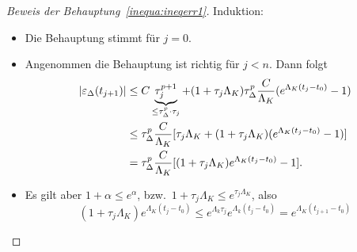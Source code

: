 \begin{proof}[Beweis der Behauptung~\eqref{inequa:ineqerr1}] Induktion:
	\begin{itemize}
		\item Die Behauptung stimmt für $j=0$.
		\item Angenommen die Behauptung ist richtig für $j<n$. Dann folgt
		\begin{align*}
			\lvert  \varepsilon_{\Delta} (t_{j+1})  \rvert
			& \leq C \underbrace{\tau_j^{p+1}}_{\leq \tau_{\Delta}^p \cdot \tau_j}+(1+\tau_j \Lambda_K) \tau_{\Delta}^p \frac{C}{\Lambda_K} (e^{\Lambda_K (t_j-t_0)} -1 ) \\
			& \leq \tau_{\Delta}^p \frac{C}{\Lambda_K} [ \tau_j \Lambda_K + (1+\tau_j \Lambda_K) (e^{\Lambda_K (t_j-t_0)}-1 ) ] \\
			& = \tau_{\Delta}^p \frac{C}{\Lambda_K} [(1+\tau_j \Lambda_K) e^{\Lambda_K (t_j-t_0)}-1 ].
		\end{align*}
		\item Es gilt aber $1+\alpha \leq e^{\alpha}$, bzw.\ $1+\tau_j \Lambda_K \leq e^{\tau_j \Lambda_K}$, also
		\begin{equation*}
			(1+\tau_j \Lambda_K) e^{\Lambda_K (t_j-t_0)} \leq e^{\Lambda_k \tau_j} e^{\Lambda_k (t_j-t_0)}
			=
			e^{\Lambda_K (t_{j+1}-t_0)}
		\end{equation*}
	\end{itemize}
\end{proof}


